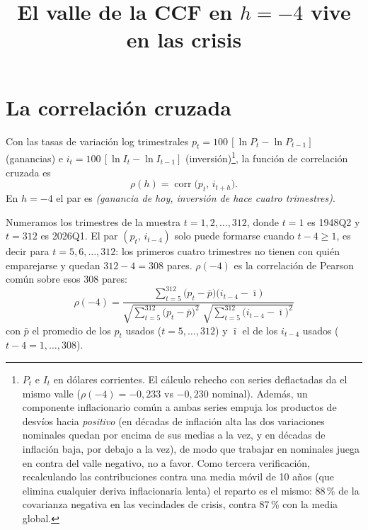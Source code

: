 \documentclass[11pt,a4paper]{article}
\title{El valle de la CCF en $h=-4$ vive en las crisis}
\author{}
\date{}
\begin{document}
\maketitle
\vspace{-3em}

\section{La correlaci\'on cruzada}

Con las tasas de variaci\'on log trimestrales
$p_t = 100\,[\ln P_t - \ln P_{t-1}]$ (ganancias) e
$i_t = 100\,[\ln I_t - \ln I_{t-1}]$ (inversi\'on)\footnote{$P_t$ e $I_t$ en
d\'olares corrientes. El c\'alculo rehecho con series deflactadas da el mismo
valle ($\rho(-4)=-0{,}233$ vs $-0{,}230$ nominal). Adem\'as, un componente
inflacionario com\'un a ambas series empuja los productos de desv\'ios hacia
\emph{positivo} (en d\'ecadas de inflaci\'on alta las dos variaciones nominales
quedan por encima de sus medias a la vez, y en d\'ecadas de inflaci\'on baja,
por debajo a la vez), de modo que trabajar en nominales juega en contra del
valle negativo, no a favor. Como tercera verificaci\'on, recalculando las
contribuciones contra una media m\'ovil de 10 a\~nos (que elimina cualquier
deriva inflacionaria lenta) el reparto es el mismo: 88\,\% de la covarianza
negativa en las vecindades de crisis, contra 87\,\% con la media global.}, la funci\'on de
correlaci\'on cruzada es
\[
\rho(h) = \operatorname{corr}\bigl(p_t,\, i_{t+h}\bigr).
\]
En $h=-4$ el par es \emph{(ganancia de hoy, inversi\'on de hace cuatro
trimestres)}.

Numeramos los trimestres de la muestra $t = 1, 2, \dots, 312$, donde $t=1$ es
1948Q2 y $t=312$ es 2026Q1. El par $(p_t,\, i_{t-4})$ solo puede formarse
cuando $t-4 \geq 1$, es decir para $t = 5, 6, \dots, 312$: los primeros cuatro
trimestres no tienen con qui\'en emparejarse y quedan $312-4=308$ pares.
$\rho(-4)$ es la correlaci\'on de Pearson com\'un sobre esos 308 pares:
\begin{equation}
\rho(-4)
= \frac{\displaystyle\sum_{t=5}^{312} \bigl(p_t - \bar p\bigr)\bigl(i_{t-4} - \bar\imath\bigr)}
       {\sqrt{\displaystyle\sum_{t=5}^{312} \bigl(p_t - \bar p\bigr)^2}\;
        \sqrt{\displaystyle\sum_{t=5}^{312} \bigl(i_{t-4} - \bar\imath\bigr)^2}}
\label{eq:ccf}
\end{equation}
con $\bar p$ el promedio de los $p_t$ usados ($t = 5,\dots,312$) y
$\bar\imath$ el de los $i_{t-4}$ usados ($t-4 = 1,\dots,308$).
\end{document}
